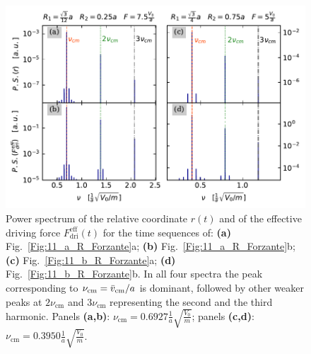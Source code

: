 \begin{figure}
\begin{center}
    \centering
    \includegraphics[width=1\linewidth]{Images/FFT.pdf}
    \caption{Power spectrum of the relative coordinate $r(t)$ and of the effective driving force $F_{\text{dri}}^{\text{eff}}(t)$ for the time sequences of: \textbf{(a)} Fig.~\ref{Fig:11_a_R_Forzante}a; \textbf{(b)} Fig.~\ref{Fig:11_a_R_Forzante}b; \textbf{(c)} Fig.~\ref{Fig:11_b_R_Forzante}a; \textbf{(d)} Fig.~\ref{Fig:11_b_R_Forzante}b. In all four spectra the peak corresponding to $\nu_\text{cm} = \Bar{v}_\text{cm}/a $ is dominant, followed by other weaker peaks at $2\nu_\text{cm}$ and $3\nu_\text{cm}$ representing the second and the third harmonic. Panels \textbf{(a,b)}:  $\nu_\text{cm} = 0.6927 \frac{1}{a}\sqrt{\frac{V_0}{m}}$; panels \textbf{(c,d)}:  $\nu_\text{cm} = 0.3950 \frac{1}{a}\sqrt{\frac{V_0}{m}}$.}
    \label{Fig:FFT}
\end{center}
\end{figure}

